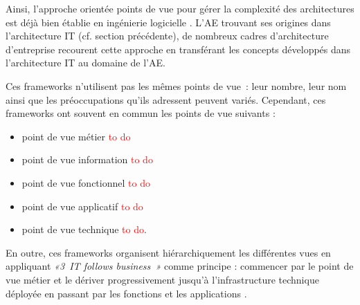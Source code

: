 Ainsi, l'approche orientée points de vue pour gérer la complexité des 
architectures est déjà bien établie en ingénierie logicielle 
\cite{steen2004supporting}. L'AE trouvant ses origines dans l'architecture IT 
(cf. section précédente), de nombreux cadres d'architecture d'entreprise 
recourent cette approche en transférant les concepts développés dans 
l'architecture IT au domaine de l'AE.

Ces frameworks n'utilisent pas les mêmes points de vue~: leur nombre, leur nom 
ainsi que les préoccupations qu'ils adressent peuvent variés. Cependant, ces 
frameworks ont souvent en commun les points de vue suivants :
\begin{itemize}
\item point de vue métier \textcolor{red}{to do}
\item point de vue information \textcolor{red}{to do}
\item point de vue fonctionnel \textcolor{red}{to do}
\item point de vue applicatif \textcolor{red}{to do}
\item point de vue technique \textcolor{red}{to do}.
\end{itemize} 
En outre, ces frameworks organisent hiérarchiquement les différentes vues en 
appliquant \emph{«3~IT follows business~»} comme principe : commencer par le 
point de vue métier et le dériver progressivement jusqu'à l'infrastructure 
technique déployée en passant par les fonctions et les applications 
\cite{winter2006essential}.




